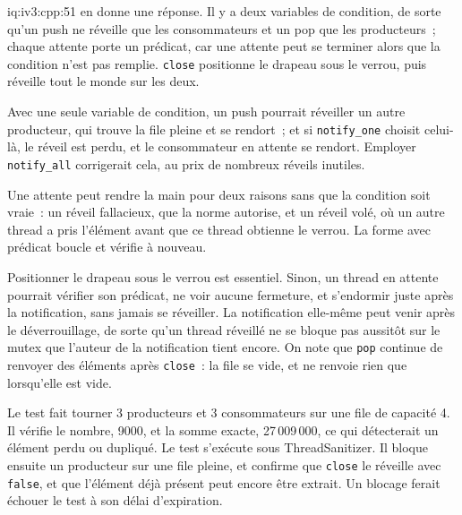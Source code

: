 \begin{solution}{iq:iv3:cpp:51}
 en donne une réponse. Il y a deux variables de condition, de sorte qu'un push ne réveille que les consommateurs et un pop que les producteurs~; chaque attente porte un prédicat, car une attente peut se terminer alors que la condition n'est pas remplie. \texttt{close} positionne le drapeau sous le verrou, puis réveille tout le monde sur les deux.
\label{lst:iv3:cp:bq}

Avec une seule variable de condition, un push pourrait réveiller un autre producteur, qui trouve la file pleine et se rendort~; et si \texttt{notify\_one} choisit celui-là, le réveil est perdu, et le consommateur en attente se rendort. Employer \texttt{notify\_all} corrigerait cela, au prix de nombreux réveils inutiles.

Une attente peut rendre la main pour deux raisons sans que la condition soit vraie~: un réveil fallacieux, que la norme autorise, et un réveil volé, où un autre thread a pris l'élément avant que ce thread obtienne le verrou. La forme avec prédicat boucle et vérifie à nouveau.

Positionner le drapeau sous le verrou est essentiel. Sinon, un thread en attente pourrait vérifier son prédicat, ne voir aucune fermeture, et s'endormir juste après la notification, sans jamais se réveiller. La notification elle-même peut venir après le déverrouillage, de sorte qu'un thread réveillé ne se bloque pas aussitôt sur le mutex que l'auteur de la notification tient encore. On note que \texttt{pop} continue de renvoyer des éléments après \texttt{close}~: la file se vide, et ne renvoie rien que lorsqu'elle est vide.

Le test fait tourner 3 producteurs et 3 consommateurs sur une file de capacité 4. Il vérifie le nombre, 9000, et la somme exacte, 27\,009\,000, ce qui détecterait un élément perdu ou dupliqué. Le test s'exécute sous ThreadSanitizer. Il bloque ensuite un producteur sur une file pleine, et confirme que \texttt{close} le réveille avec \texttt{false}, et que l'élément déjà présent peut encore être extrait. Un blocage ferait échouer le test à son délai d'expiration.

\end{solution}

